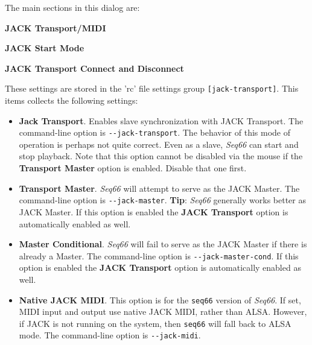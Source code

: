    The main sections in this dialog are:

   \begin{enumber}
      \item \textbf{JACK Transport/MIDI}
      \item \textbf{JACK Start Mode}
      \item \textbf{JACK Transport Connect and Disconnect}
   \end{enumber}

   \setcounter{ItemCounter}{0}      %

   These settings are stored in the 'rc' file settings group
   \texttt{[jack-transport]}.
   This items collects the following settings:

   \begin{itemize}
      \item \textbf{Jack Transport}.
         Enables slave synchronization with JACK Transport.
         The command-line option is \texttt{-{}-jack-transport}.
         The behavior of this mode of operation is perhaps not quite
         correct.  Even as a slave, \textsl{Seq66} can start and
         stop playback.
         Note that this option cannot be disabled via the mouse if the
         \textbf{Transport Master} option is enabled.  Disable that one first.
      \item \textbf{Transport Master}.
         \textsl{Seq66} will attempt to serve as the JACK Master.
         The command-line option is \texttt{-{}-jack-master}.
         \textbf{Tip}:
         \textsl{Seq66} generally works better as JACK Master.
         If this option is enabled the \textbf{JACK Transport} option is
         automatically enabled as well.
      \item \textbf{Master Conditional}.
         \textsl{Seq66} will fail to serve as the JACK Master if there is
         already a Master.
         The command-line option is \texttt{-{}-jack-master-cond}.
         If this option is enabled the \textbf{JACK Transport} option is
         automatically enabled as well.
      \item \textbf{Native JACK MIDI}.
         This option is for the \texttt{seq66} version of
         \textsl{Seq66}.
         If set, MIDI input and output use native JACK MIDI,
         rather than ALSA.  However, if JACK is not running on the
         system, then \texttt{seq66} will fall back to ALSA mode.
         The command-line option is \texttt{-{}-jack-midi}.
   \end{itemize}

